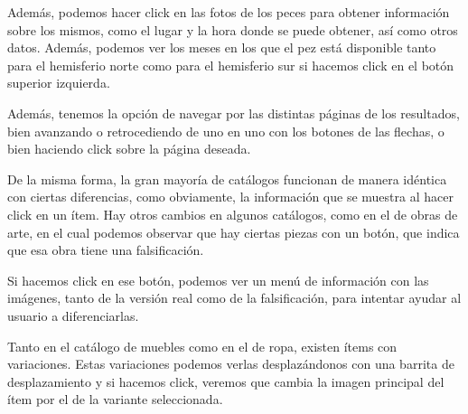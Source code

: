 
Además, podemos hacer click en las fotos de los peces para obtener información sobre los mismos, como el lugar y la hora donde se puede obtener, así como otros datos. Además, podemos ver los meses en los que el pez está disponible tanto para el hemisferio norte como para el hemisferio sur si hacemos click en el botón superior izquierda.\\



Además, tenemos la opción de navegar por las distintas páginas de los resultados, bien avanzando o retrocediendo de uno en uno con los botones de las flechas, o bien haciendo click sobre la página deseada.\\


De la misma forma, la gran mayoría de catálogos funcionan de manera idéntica con ciertas diferencias, como obviamente, la información que se muestra al hacer click en un ítem. Hay otros cambios en algunos catálogos, como en el de obras de arte, en el cual podemos observar que hay ciertas piezas con un botón, que indica que esa obra tiene una falsificación.\\


Si hacemos click en ese botón, podemos ver un menú de información con las imágenes, tanto de la versión real como de la falsificación, para intentar ayudar al usuario a diferenciarlas.\\


Tanto en el catálogo de muebles como en el de ropa, existen ítems con variaciones. Estas variaciones podemos verlas desplazándonos con una barrita de desplazamiento y si hacemos click, veremos que cambia la imagen principal del ítem por el de la variante seleccionada.\\


